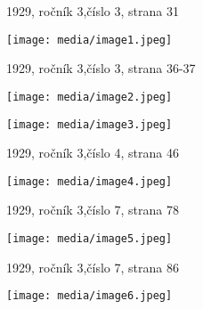 1929, ročník 3,číslo 3, strana 31

\texttt{[image: media/image1.jpeg]}

1929, ročník 3,číslo 3, strana 36-37

\texttt{[image: media/image2.jpeg]}

\texttt{[image: media/image3.jpeg]}

1929, ročník 3,číslo 4, strana 46

\texttt{[image: media/image4.jpeg]}

1929, ročník 3,číslo 7, strana 78

\texttt{[image: media/image5.jpeg]}

1929, ročník 3,číslo 7, strana 86

\texttt{[image: media/image6.jpeg]}
